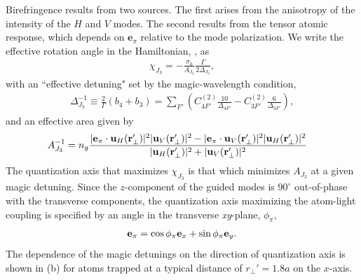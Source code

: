\documentclass[preprint, aps,pra,onecolumn]{revtex4-1} %
\newcommand{\qaxis}{\mathbf{e}_\pi}
\newcommand{\chieff}{\chi_{J_3}}
\newcommand{\comment}[1]{{\color{Maroon} #1}}
\begin{document}
Birefringence results from two sources.  
The first arises from the anisotropy of the intensity of the $H$ and $V$ modes.  
The second results from the tensor atomic response, which depends on $\mathbf{e}_\pi$ relative to the mode polarization. 
We write the effective rotation angle in the Hamiltonian, , as
	\begin{align} \label{Eq::chieff}
		\chieff = - \frac{\sigma_0}{A_{J_3}} \frac{\Gamma}{ 2 \Delta_{J_3}},
	\end{align}
with an ``effective detuning" set by the magic-wavelength condition,
	\begin{align} \label{Eq::SqueezingEffectiveDetuning}
		 \Delta_{J_3}^{-1} \equiv \frac{2}{\Gamma} (b_4 + b_3) =   \sum_{F'}  \left( C^{(2)}_{4F'}\frac{10}{\Delta_{4F'}} -  C^{(2)}_{3F'}\frac{6}{ \Delta_{3F'} } \right),
	\end{align}
and an effective area given by
	\begin{align} \label{Eq::SqueezingModeArea}
		A_{J_3}^{-1} & = n_g \frac{ |\mathbf{e}_\pi \cdot \mathbf{u}_H(\mathbf{r}'_\perp) |^2 |\mathbf{u}_V(\mathbf{r}'_\perp)|^2 - |\mathbf{e}_\pi \cdot \mathbf{u}_V(\mathbf{r}'_\perp)|^2 |\mathbf{u}_H(\mathbf{r}'_\perp)|^2}{ |\mathbf{u}_H(\mathbf{r}'_\perp)|^2 + |\mathbf{u}_V(\mathbf{r}'_\perp)|^2 } 
	\end{align}	
The quantization axis that maximizes $\chieff$ is that which minimizes $A_{J_3}$ at a given magic detuning.  
Since the $z$-component of the guided modes is $90^\circ$ out-of-phase with the transverse components, the quantization axis maximizing the atom-light coupling is specified by an angle in the transverse \emph{xy}-plane, $\phi_\pi$,
	\begin{align} \label{Eq::QuantizationAxis}
		\qaxis = \cos \phi_\pi \mbf{e}_x + \sin \phi_\pi \mbf{e}_y.
	\end{align}
The dependence of the magic detunings on the direction of quantization axis is shown in (b) for atoms trapped at a typical distance of $r_\perp'=1.8a$ on the $x$-axis.   
\end{document}
